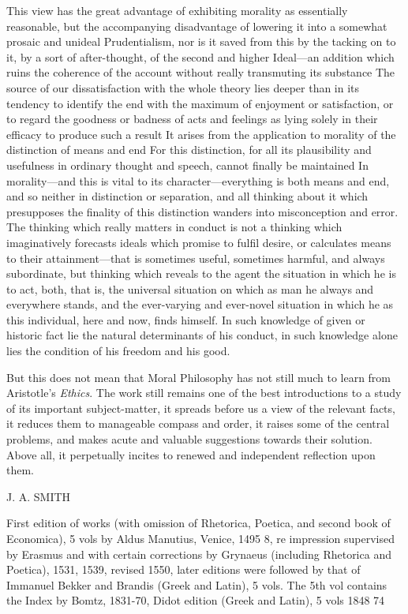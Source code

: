 This view has the great advantage of exhibiting morality as essentially
reasonable, but the accompanying disadvantage of lowering it into a somewhat
prosaic and unideal Prudentialism, nor is it saved from this by the tacking on
to it, by a sort of after-thought, of the second and higher Ideal—an
addition which ruins the coherence of the account without really transmuting
its substance The source of our dissatisfaction with the whole theory lies
deeper than in its tendency to identify the end with the maximum of enjoyment
or satisfaction, or to regard the goodness or badness of acts and feelings as
lying solely in their efficacy to produce such a result It arises from the
application to morality of the distinction of means and end For this
distinction, for all its plausibility and usefulness in ordinary thought and
speech, cannot finally be maintained In morality—and this is vital to its
character—everything is both means and end, and so neither in distinction
or separation, and all thinking about it which presupposes the finality of this
distinction wanders into misconception and error. The thinking which really
matters in conduct is not a thinking which imaginatively forecasts ideals which
promise to fulfil desire, or calculates means to their attainment—that is
sometimes useful, sometimes harmful, and always subordinate, but thinking which
reveals to the agent the situation in which he is to act, both, that is, the
universal situation on which as man he always and everywhere stands, and the
ever-varying and ever-novel situation in which he as this individual, here and
now, finds himself. In such knowledge of given or historic fact lie the natural
determinants of his conduct, in such knowledge alone lies the condition of his
freedom and his good.

But this does not mean that Moral Philosophy has not still much to learn from
Aristotle’s \emph{Ethics}. The work still remains one of the best
introductions to a study of its important subject-matter, it spreads before us
a view of the relevant facts, it reduces them to manageable compass and order,
it raises some of the central problems, and makes acute and valuable
suggestions towards their solution. Above all, it perpetually incites to
renewed and independent reflection upon them.

J. A. SMITH


First edition of works (with omission of Rhetorica, Poetica, and second book of
Economica), 5 vols by Aldus Manutius, Venice, 1495 8, re impression supervised
by Erasmus and with certain corrections by Grynaeus (including Rhetorica and
Poetica), 1531, 1539, revised 1550, later editions were followed by that of
Immanuel Bekker and Brandis (Greek and Latin), 5 vols. The 5th vol contains the
Index by Bomtz, 1831-70, Didot edition (Greek and Latin), 5 vols 1848 74

